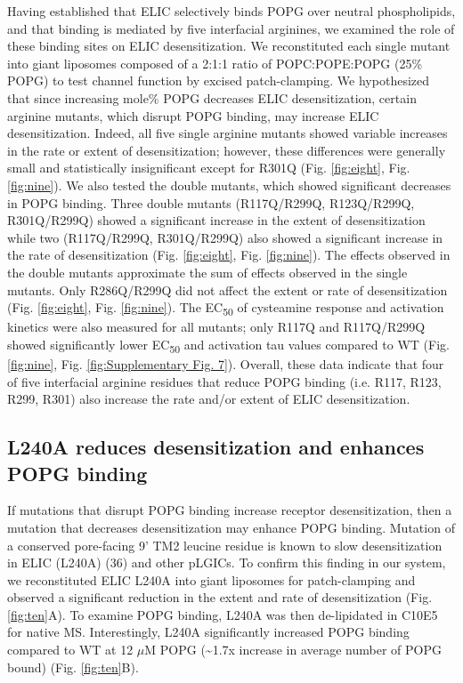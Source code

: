 Having established that ELIC selectively binds POPG over neutral
phospholipids, and that binding is mediated by five interfacial
arginines, we examined the role of these binding sites on ELIC
desensitization. We reconstituted each single mutant into giant
liposomes composed of a 2:1:1 ratio of POPC:POPE:POPG (25\% POPG) to
test channel function by excised patch-clamping. We hypothesized that
since increasing mole\% POPG decreases ELIC desensitization, certain
arginine mutants, which disrupt POPG binding, may increase ELIC
desensitization. Indeed, all five single arginine mutants showed
variable increases in the rate or extent of desensitization; however,
these differences were generally small and statistically insignificant
except for R301Q (Fig. \ref{fig:eight}, Fig. \ref{fig:nine}). We also tested the double mutants,
which showed significant decreases in POPG binding. Three double mutants
(R117Q/R299Q, R123Q/R299Q, R301Q/R299Q) showed a significant increase in
the extent of desensitization while two (R117Q/R299Q, R301Q/R299Q) also
showed a significant increase in the rate of desensitization (Fig. \ref{fig:eight},
Fig. \ref{fig:nine}). The effects observed in the double mutants approximate the sum
of effects observed in the single mutants. Only R286Q/R299Q did not
affect the extent or rate of desensitization (Fig. \ref{fig:eight}, Fig. \ref{fig:nine}). The
EC\textsubscript{50} of cysteamine response and activation kinetics were
also measured for all mutants; only R117Q and R117Q/R299Q showed
significantly lower EC\textsubscript{50} and activation tau values
compared to WT (Fig. \ref{fig:nine}, Fig. \ref{fig:Supplementary Fig. 7}). Overall, these data
indicate that four of five interfacial arginine residues that reduce
POPG binding (i.e. R117, R123, R299, R301) also increase the rate and/or
extent of ELIC desensitization.

\subsection{L240A reduces desensitization and enhances POPG binding}

If mutations that disrupt POPG binding increase receptor
desensitization, then a mutation that decreases desensitization may
enhance POPG binding. Mutation of a conserved pore-facing 9' TM2 leucine
residue is known to slow desensitization in ELIC (L240A) (36) and other
pLGICs. To confirm this finding in our system, we reconstituted ELIC
L240A into giant liposomes for patch-clamping and observed a significant
reduction in the extent and rate of desensitization (Fig. \ref{fig:ten}A). To
examine POPG binding, L240A was then de-lipidated in C10E5 for native
MS. Interestingly, L240A significantly increased POPG binding compared
to WT at 12 $\mu$M POPG (\textasciitilde{}1.7x increase in average number of
POPG bound) (Fig. \ref{fig:ten}B).


